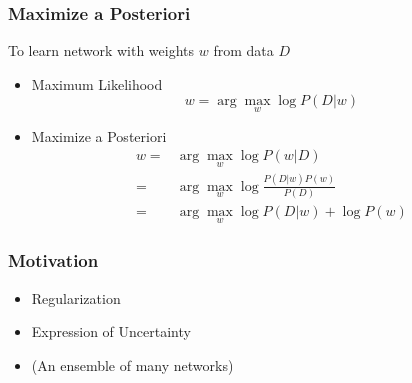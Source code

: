 \begin{frame}
  \frametitle{Maximize a Posteriori}
  To learn network with weights $w$ from data $D$
  \begin{itemize}
  \item Maximum Likelihood
    \begin{equation*}
      w = \arg \max_w \log P(D | w)
    \end{equation*}
  \item Maximize a Posteriori
    \begin{align*}
      w
      =& \arg \max_w \log P(w | D) \\
      =& \arg \max_w \log \frac{P(D | w) P(w)}{P(D)} \\
      =& \arg \max_w \log P(D | w) + \log P(w)
    \end{align*}
  \end{itemize}
\end{frame}


\begin{frame}
  \frametitle{Motivation}
  \begin{itemize}
  \item Regularization 
  \item Expression of Uncertainty
  \item (An ensemble of many networks)
  \end{itemize}
\end{frame}

\begin{frame}
  \frametitle{}
\end{frame}